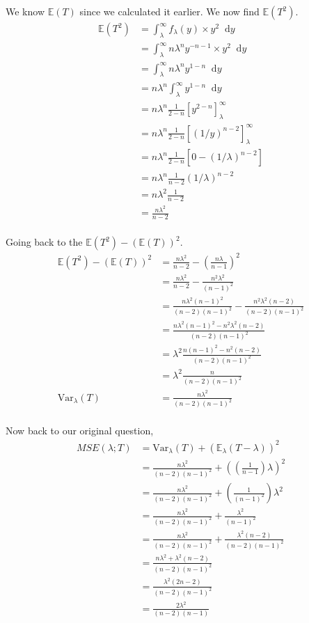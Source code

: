 \documentclass{article}
\newcommand{\diff}{\mathop{}\!\mathrm{d}}
\newcommand{\expect}{\mathbb{E}}
\newcommand{\var}{\text{Var}}
\begin{document}
We know $\expect(T)$ since we calculated it earlier. We now find $\expect(T^2)$.
\begin{align*}
    \expect(T^2) &= \int_\lambda^\infty f_\lambda(y) \times y^2 \diff y \\
    &= \int_\lambda^\infty n \lambda^n y^{-n-1} \times y^2 \diff y \\
    &= \int_\lambda^\infty n \lambda^n y^{1-n} \diff y \\
    &= n \lambda^n \int_\lambda^\infty y^{1-n} \diff y \\
    &= n \lambda^n \frac{1}{2-n} \left[y^{2-n}\right]_\lambda^\infty \\
    &= n \lambda^n \frac{1}{2-n} \left[(1/y)^{n-2}\right]_\lambda^\infty \\
    &= n \lambda^n \frac{1}{2-n} \left[0 - (1/\lambda)^{n-2}\right] \\
    &= n \lambda^n \frac{1}{n-2} (1/\lambda)^{n-2} \\
    &= n \lambda^2 \frac{1}{n-2} \\
    &= \frac{n \lambda^2}{n-2} \\
\end{align*}

Going back to the $\expect(T^2) - (\expect(T))^2$.
\begin{align*}
    \expect(T^2) - (\expect(T))^2
    &= \frac{n \lambda^2}{n-2} - \left(\frac{n \lambda}{n-1}\right)^2 \\
    &= \frac{n \lambda^2}{n-2} - \frac{n^2 \lambda^2}{(n-1)^2} \\
    &= \frac{n \lambda^2 (n-1)^2}{(n-2)(n-1)^2} - \frac{n^2 \lambda^2 (n-2)}{(n-2)(n-1)^2} \\
    &= \frac{n \lambda^2 (n-1)^2 - n^2 \lambda^2 (n-2)}{(n-2)(n-1)^2} \\
    &= \lambda^2 \frac{n(n-1)^2 - n^2(n-2)}{(n-2)(n-1)^2} \\
    &= \lambda^2 \frac{n}{(n-2)(n-1)^2} \\
    \var_\lambda (T) &= \frac{n\lambda^2}{(n-2)(n-1)^2} \\
\end{align*}

Now back to our original question,
\begin{align*}
    MSE(\lambda; T) &= \var_\lambda (T) + \left(\expect_\lambda (T - \lambda)\right)^2 \\
    &= \frac{n\lambda^2}{(n-2)(n-1)^2} + \left(\left(\frac{1}{n-1}\right)\lambda\right)^2 \\
    &= \frac{n\lambda^2}{(n-2)(n-1)^2} + \left(\frac{1}{(n-1)^2}\right)\lambda^2 \\
    &= \frac{n\lambda^2}{(n-2)(n-1)^2} + \frac{\lambda^2}{(n-1)^2} \\
    &= \frac{n\lambda^2}{(n-2)(n-1)^2} + \frac{\lambda^2(n-2)}{(n-2)(n-1)^2} \\
    &= \frac{n\lambda^2 + \lambda^2(n-2)}{(n-2)(n-1)^2} \\
    &= \frac{\lambda^2(2n-2)}{(n-2)(n-1)^2} \\
    &= \frac{2\lambda^2}{(n-2)(n-1)} \\
\end{align*}
\end{document}
